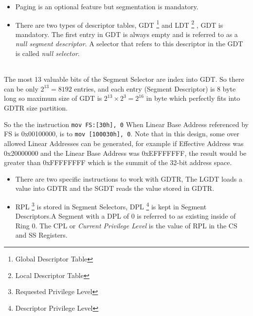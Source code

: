 \begin{note}
\begin{itemize}
\item Paging is an optional feature but segmentation is mandatory.
\item There are two types of descriptor tables, GDT \footnote{Global Descriptor Table}  and LDT \footnote{Local Descriptor Table} , GDT is mandatory.
\remark \normalfont The first entry in GDT is always empty and is referred to as a \textit{null segment descriptor}. A selector that refers to this descriptor in the GDT is called \textit{null selector}.
\end{itemize}
\\

The most 13 valuable bits of the Segment Selector are index into GDT. So there can be only $2^{13} = 8192$ entries, and each entry (Segment Descriptor) is 8 byte long so maximum size of GDT is $2^{13} \times 2^{3} = 2^{16}$ in byte which perfectly fits into GDTR size partition.



So the the instruction
\lstinline [language={[x86masm]Assembler}] {mov FS:[30h], 0}
When Linear Base Address referenced by FS is 0x00100000, is to
\lstinline [language={[x86masm]Assembler}] {mov [100030h], 0}. Note that in this design, some over allowed Linear Addresses can be generated, for example if Effective Address was 0x20000000 and the Linear Base Address was 0xEFFFFFFF, the result would be greater than 0xFFFFFFFF which is the summit of the 32-bit address space.
\begin{itemize}
\item There are two specific instructions to work with GDTR, The LGDT loads a value into GDTR and the SGDT reads the value stored in GDTR.
\item RPL \footnote{Requested Privilege Level} is stored in Segment Selectors, DPL \footnote{Descriptor Privilege Level} is kept in Segment Descriptors.A Segment with a DPL of 0 is referred to as existing inside of Ring 0. The CPL or \textit{Current Privilege Level} is the value of RPL in the CS and SS Registers.
\end{itemize}

\end{note}

